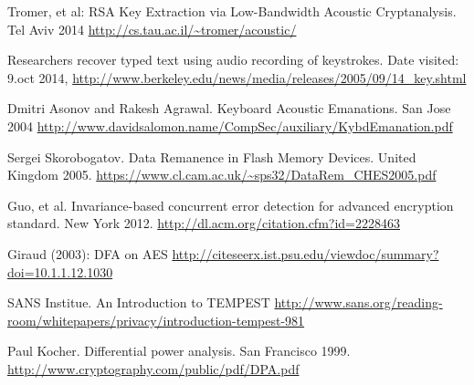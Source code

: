 \renewcommand*{\bibname}{References}



\begin{thebibliography}{18}


 Tromer, et al: RSA Key Extraction via Low-Bandwidth Acoustic Cryptanalysis. Tel Aviv 2014 
\url{http://cs.tau.ac.il/~tromer/acoustic/}



 Researchers recover typed text using audio recording of keystrokes. Date visited: 9.oct 2014, 
\url{http://www.berkeley.edu/news/media/releases/2005/09/14_key.shtml}

 Dmitri Asonov and Rakesh Agrawal. Keyboard Acoustic Emanations. San Jose 2004
\url{http://www.davidsalomon.name/CompSec/auxiliary/KybdEmanation.pdf}


 Sergei Skorobogatov. Data Remanence in Flash Memory Devices. United Kingdom 2005. 
\url{https://www.cl.cam.ac.uk/~sps32/DataRem_CHES2005.pdf}


 Guo, et al. Invariance-based concurrent error detection for advanced encryption standard. New York 2012.
\url{http://dl.acm.org/citation.cfm?id=2228463}

 Giraud (2003): DFA on AES
\url{http://citeseerx.ist.psu.edu/viewdoc/summary?doi=10.1.1.12.1030}


 SANS Institue. An Introduction to TEMPEST
\url{http://www.sans.org/reading-room/whitepapers/privacy/introduction-tempest-981}



 Paul Kocher. Differential power analysis. San Francisco 1999.
\url{http://www.cryptography.com/public/pdf/DPA.pdf}


\end{thebibliography}
